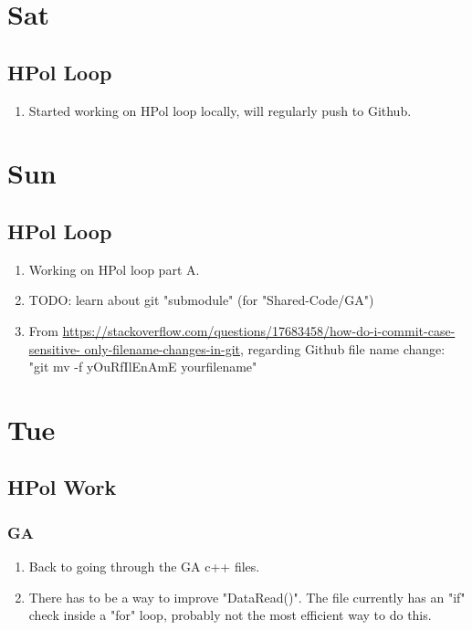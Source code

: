 \documentclass[12pt,letterpaper]{article}
\begin{document}
\tableofcontents

\section{Sat}
\subsection{HPol Loop}
\begin{enumerate}
  \item Started working on HPol loop locally,
    will regularly push to Github.
\end{enumerate}

\section{Sun}
\subsection{HPol Loop}
\begin{enumerate}
  \item Working on HPol loop part A.
  \item TODO: learn about git "submodule" (for "Shared-Code/GA")
  \item From
    \url{https://stackoverflow.com/questions/17683458/how-do-i-commit-case-sensitive-
    only-filename-changes-in-git}, regarding Github file name change:\\
    "git mv -f yOuRfIlEnAmE yourfilename"
\end{enumerate}

\newpage
\setcounter{section}{3}

\section{Tue}
\subsection{HPol Work}
\subsubsection{GA}
\begin{enumerate}
  \item Back to going through the GA c++ files.
  \item There has to be a way to improve "DataRead()". The file currently has an "if" 
    check inside a "for" loop, probably not the most efficient way to do this.
\end{enumerate}
\end{document}

